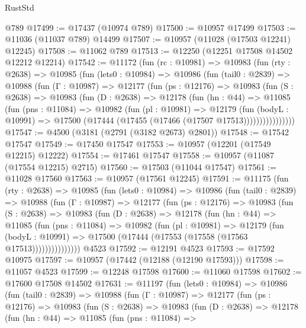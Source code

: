 \begin{lexlean}{RustStd}
\begin{coremodule}
{\begin{coremodule}
{{{{{{{{{{{{{{{{{{{{{{{{{{{{{{{{{    @789
@17499 := @17437 (@10974 @789)
@17500 := @10957 @17499
@17503 := @11036 (@11037 @789) @14499
@17507 := @10957 (@11028 (@17503 @12241) @12245)
@17508 := @11062 @789
@17513 := @12250 (@12251 @17508 @14502 @12212 @12214)
@17542 := @11172
    (fun (rc : @10981) =>
    @10983
      (fun (rty : @2638) =>
      @10985
        (fun (lets0 : @10984) =>
        @10986
          (fun (tail0 : @2839) =>
          @10988
            (fun (Γ : @10987) =>
            @12177
              (fun (ps : @12176) =>
              @10983
                (fun (S : @2638) =>
                @10983
                  (fun (D : @2638) =>
                  @12178
                    (fun (hn : @44) =>
                    @11085
                      (fun (pns : @11084) =>
                      @10982
                        (fun (pl : @10981) =>
                        @12179
                          (fun (bodyL : @10991) =>
                          @17500 (@17444 (@17455 (@17466 (@17507 @17513))))))))))))))))
@17547 := @4500 (@3181 (@2791 (@3182 @2673) @2801))
@17548 := @17542 @17547
@17549 := @17450 @17547
@17553 := @10957 (@12201 (@17549 @12215) @12222)
@17554 := @17461 @17547
@17558 := @10957 (@11087 (@17554 @12215) @2715)
@17560 := @17503 (@11044 @17547)
@17561 := @11028 @17560
@17563 := @10957 (@17561 @12245)
@17591 := @11175
    (fun (rty : @2638) =>
    @10985
      (fun (lets0 : @10984) =>
      @10986
        (fun (tail0 : @2839) =>
        @10988
          (fun (Γ : @10987) =>
          @12177
            (fun (ps : @12176) =>
            @10983
              (fun (S : @2638) =>
              @10983
                (fun (D : @2638) =>
                @12178
                  (fun (hn : @44) =>
                  @11085
                    (fun (pns : @11084) =>
                    @10982
                      (fun (pl : @10981) =>
                      @12179
                        (fun (bodyL : @10991) =>
                        @17500 (@17444 (@17553 (@17558 (@17563 @17513)))))))))))))))
    @4523
@17592 := @12191 @4523
@17593 := @17592 @10975
@17597 := @10957 (@17442 (@12188 (@12190 @17593)))
@17598 := @11057 @4523
@17599 := @12248 @17598
@17600 := @11060 @17598
@17602 := @17600 @17508 @14502
@17631 := @11197
    (fun (lets0 : @10984) =>
    @10986
      (fun (tail0 : @2839) =>
      @10988
        (fun (Γ : @10987) =>
        @12177
          (fun (ps : @12176) =>
          @10983
            (fun (S : @2638) =>
            @10983
              (fun (D : @2638) =>
              @12178
                (fun (hn : @44) =>
                @11085
                  (fun (pns : @11084) =>
}}}}}}}}}}}}}}}}}}}}}}}}}}}}}}}}}
\end{coremodule}}
\end{coremodule}
\end{lexlean}
